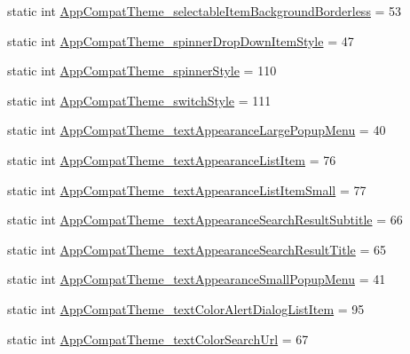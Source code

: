\begin{DoxyCompactItemize}
\item 
static int \hyperlink{classandroid_1_1support_1_1design_1_1R_1_1styleable_aece61d63468a2001739bbddff229db4f}{App\+Compat\+Theme\+\_\+selectable\+Item\+Background\+Borderless} = 53
\item 
static int \hyperlink{classandroid_1_1support_1_1design_1_1R_1_1styleable_a762707a1c6a6aa1a8ef4921392a1718d}{App\+Compat\+Theme\+\_\+spinner\+Drop\+Down\+Item\+Style} = 47
\item 
static int \hyperlink{classandroid_1_1support_1_1design_1_1R_1_1styleable_a2acd7c3695b4d10f59e576bf69cfb846}{App\+Compat\+Theme\+\_\+spinner\+Style} = 110
\item 
static int \hyperlink{classandroid_1_1support_1_1design_1_1R_1_1styleable_a3990aa9db190f4ae9a7169c7f468bcb7}{App\+Compat\+Theme\+\_\+switch\+Style} = 111
\item 
static int \hyperlink{classandroid_1_1support_1_1design_1_1R_1_1styleable_a9ce465853ff5c3303afda4d0d788d041}{App\+Compat\+Theme\+\_\+text\+Appearance\+Large\+Popup\+Menu} = 40
\item 
static int \hyperlink{classandroid_1_1support_1_1design_1_1R_1_1styleable_af9613bb433f8ea578ca10997d7f31384}{App\+Compat\+Theme\+\_\+text\+Appearance\+List\+Item} = 76
\item 
static int \hyperlink{classandroid_1_1support_1_1design_1_1R_1_1styleable_abc32a69cec9cd2518cfcbb996cbd9b21}{App\+Compat\+Theme\+\_\+text\+Appearance\+List\+Item\+Small} = 77
\item 
static int \hyperlink{classandroid_1_1support_1_1design_1_1R_1_1styleable_a5fb9efd1776571a8f6fb3e02b4b4602c}{App\+Compat\+Theme\+\_\+text\+Appearance\+Search\+Result\+Subtitle} = 66
\item 
static int \hyperlink{classandroid_1_1support_1_1design_1_1R_1_1styleable_aa3f93225ffeded406d20658eb3447964}{App\+Compat\+Theme\+\_\+text\+Appearance\+Search\+Result\+Title} = 65
\item 
static int \hyperlink{classandroid_1_1support_1_1design_1_1R_1_1styleable_a244ffcdac7c8cd9bada32939947ccf3d}{App\+Compat\+Theme\+\_\+text\+Appearance\+Small\+Popup\+Menu} = 41
\item 
static int \hyperlink{classandroid_1_1support_1_1design_1_1R_1_1styleable_abc7c2b20a8ab2fd4ce11d97bc2dcf36e}{App\+Compat\+Theme\+\_\+text\+Color\+Alert\+Dialog\+List\+Item} = 95
\item 
static int \hyperlink{classandroid_1_1support_1_1design_1_1R_1_1styleable_aafa1ab7dc0cc5540f3c561bc2dcdb146}{App\+Compat\+Theme\+\_\+text\+Color\+Search\+Url} = 67

\end{DoxyCompactItemize}
